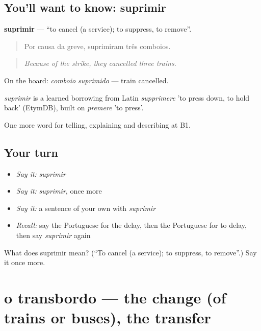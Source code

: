 \subsection*{You'll want to know: suprimir}
\textbf{suprimir} — \textquotedblleft{}to cancel (a service); to suppress, to remove\textquotedblright{}.

\begin{quote}
Por causa da greve, suprimiram três comboios.
\end{quote}

\begin{quote}
\emph{Because of the strike, they cancelled three trains.}
\end{quote}

On the board: \emph{comboio suprimido} — train cancelled.

\begin{cousinweb}
\emph{suprimir} is a learned borrowing from Latin \emph{supprimere} 'to press down, to hold back' (EtymDB), built on \emph{premere} 'to press'.
\end{cousinweb}

\begin{grammarlens}[title={What you've built}]
One more word for telling, explaining and describing at B1.
\end{grammarlens}

\subsection*{Your turn}
\begin{itemize}
\raggedright
  \item \emph{Say it:} \emph{suprimir}
  \item \emph{Say it:} \emph{suprimir}, once more
  \item \emph{Say it:} a sentence of your own with \emph{suprimir}
  \item \emph{Recall:} say the Portuguese for the delay, then the Portuguese for to delay, then say \emph{suprimir} again
\end{itemize}

\begin{tcolorbox}[breakable,colback=teal!4,colframe=teal!35!black,title={Before you move on}]
What does suprimir mean? (\textquotedblleft{}To cancel (a service); to suppress, to remove\textquotedblright{}.) Say it once more.
\end{tcolorbox}
\section[o transbordo]{o transbordo — the change (of trains or buses), the transfer}

